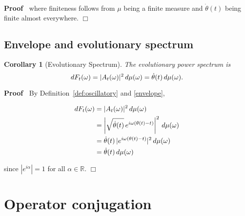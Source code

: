 \documentclass{article}
\newenvironment{proof}{\noindent\textbf{Proof\ }}{\hspace*{\fill}$\Box$\medskip}
\newtheorem{corollary}{Corollary}
\begin{document}
\begin{proof}
  where finiteness follows from $\mu$ being a finite measure and $\dot{\theta}
  (t)$ being finite almost everywhere.
\end{proof}

\subsection{Envelope and evolutionary spectrum}

\begin{corollary}[Evolutionary Spectrum]
  \label{cor:evolving_spec}The evolutionary power spectrum is
  \begin{equation}
    \label{eq:evolutionary_spec} dF_t (\omega) = \lvert A_t (\omega) \rvert^2 
    \hspace{0.17em} d \mu (\omega) = \dot{\theta} (t)  \hspace{0.17em} d \mu
    (\omega) .
  \end{equation}
\end{corollary}

\begin{proof}
  By Definition~\ref{def:oscillatory} and \eqref{envelope},
  
  \begin{align}
    dF_t (\omega) & = \lvert A_t (\omega) \rvert^2  \hspace{0.17em} d \mu
    (\omega) \\
    & = \left| \sqrt{\dot{\theta} (t)}  \hspace{0.17em} e^{i \omega (\theta
    (t) - t)} \right|^2  \hspace{0.17em} d \mu (\omega) \\
    & = \dot{\theta} (t) \hspace{0.17em} |e^{i \omega (\theta (t) - t)} |^2 
    \hspace{0.17em} d \mu (\omega) \\
    & = \dot{\theta} (t)  \hspace{0.17em} d \mu (\omega) 
  \end{align}
  
  since $|e^{i \alpha} | = 1$ for all $\alpha \in \mathbb{R}$.
\end{proof}

\section{Operator conjugation}\label{sec:conjugation}
\end{document}
